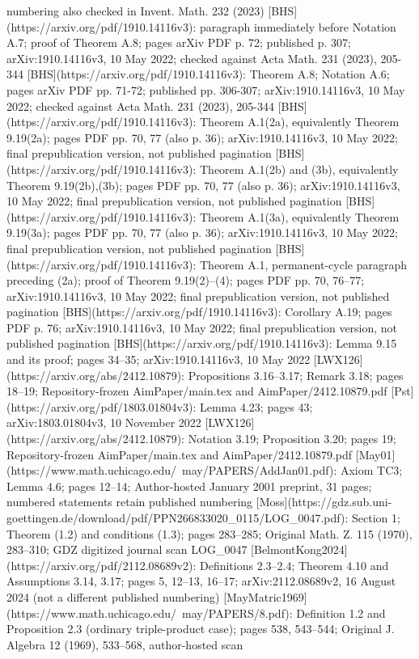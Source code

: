 \begin{theorem}
numbering also checked in Invent. Math. 232 (2023) [BHS](https://arxiv.org/pdf/1910.14116v3): paragraph immediately before Notation A.7; proof of Theorem A.8; pages arXiv PDF p. 72; published p. 307; arXiv:1910.14116v3, 10 May 2022; checked against Acta Math. 231 (2023), 205-344 [BHS](https://arxiv.org/pdf/1910.14116v3): Theorem A.8; Notation A.6; pages arXiv PDF pp. 71-72; published pp. 306-307; arXiv:1910.14116v3, 10 May 2022; checked against Acta Math. 231 (2023), 205-344 [BHS](https://arxiv.org/pdf/1910.14116v3): Theorem A.1(2a), equivalently Theorem 9.19(2a); pages PDF pp. 70, 77 (also p. 36); arXiv:1910.14116v3, 10 May 2022; final prepublication version, not published pagination [BHS](https://arxiv.org/pdf/1910.14116v3): Theorem A.1(2b) and (3b), equivalently Theorem 9.19(2b),(3b); pages PDF pp. 70, 77 (also p. 36); arXiv:1910.14116v3, 10 May 2022; final prepublication version, not published pagination [BHS](https://arxiv.org/pdf/1910.14116v3): Theorem A.1(3a), equivalently Theorem 9.19(3a); pages PDF pp. 70, 77 (also p. 36); arXiv:1910.14116v3, 10 May 2022; final prepublication version, not published pagination [BHS](https://arxiv.org/pdf/1910.14116v3): Theorem A.1, permanent-cycle paragraph preceding (2a); proof of Theorem 9.19(2)–(4); pages PDF pp. 70, 76–77; arXiv:1910.14116v3, 10 May 2022; final prepublication version, not published pagination [BHS](https://arxiv.org/pdf/1910.14116v3): Corollary A.19; pages PDF p. 76; arXiv:1910.14116v3, 10 May 2022; final prepublication version, not published pagination [BHS](https://arxiv.org/pdf/1910.14116v3): Lemma 9.15 and its proof; pages 34–35; arXiv:1910.14116v3, 10 May 2022 [LWX126](https://arxiv.org/abs/2412.10879): Propositions 3.16–3.17; Remark 3.18; pages 18–19; Repository-frozen AimPaper/main.tex and AimPaper/2412.10879.pdf [Pst](https://arxiv.org/pdf/1803.01804v3): Lemma 4.23; pages 43; arXiv:1803.01804v3, 10 November 2022 [LWX126](https://arxiv.org/abs/2412.10879): Notation 3.19; Proposition 3.20; pages 19; Repository-frozen AimPaper/main.tex and AimPaper/2412.10879.pdf [May01](https://www.math.uchicago.edu/~may/PAPERS/AddJan01.pdf): Axiom TC3; Lemma 4.6; pages 12–14; Author-hosted January 2001 preprint, 31 pages; numbered statements retain published numbering [Moss](https://gdz.sub.uni-goettingen.de/download/pdf/PPN266833020_0115/LOG_0047.pdf): Section 1; Theorem (1.2) and conditions (1.3); pages 283–285; Original Math. Z. 115 (1970), 283–310; GDZ digitized journal scan LOG_0047 [BelmontKong2024](https://arxiv.org/pdf/2112.08689v2): Definitions 2.3–2.4; Theorem 4.10 and Assumptions 3.14, 3.17; pages 5, 12–13, 16–17; arXiv:2112.08689v2, 16 August 2024 (not a different published numbering) [MayMatric1969](https://www.math.uchicago.edu/~may/PAPERS/8.pdf): Definition 1.2 and Proposition 2.3 (ordinary triple-product case); pages 538, 543–544; Original J. Algebra 12 (1969), 533–568, author-hosted scan

\end{theorem}
